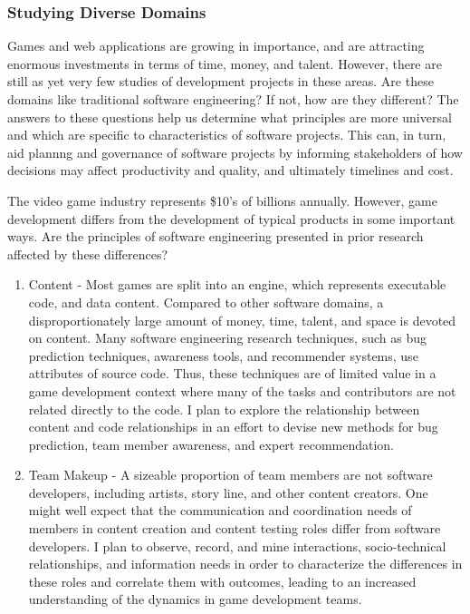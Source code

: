 \documentclass[10pt]{article}
\newcommand\Subsection[1]{\subsubsection*{\small #1}}
\begin{document}
\begin{small}
\Subsection{Studying Diverse Domains}

Games and web applications are growing in importance, and are attracting
enormous investments in terms of time, money, and talent. However, there are
still as yet very few studies of development projects in these areas. Are these
domains like traditional software engineering? If not, how are they different?
The answers to these questions help us determine what principles are more
universal and which are specific to characteristics of software projects.  This
can, in turn, aid plannng and governance of software projects by informing
stakeholders of how decisions may affect productivity and quality, and ultimately
timelines and cost.

The video game industry represents \$10's of billions annually. However, game
development differs from the development of typical products in some important
ways.  Are the principles of software engineering presented in prior research
affected by these differences?

\begin{enumerate}

\item Content - Most games are split into an engine, which represents executable code,
    and data content. Compared to other software domains, a disproportionately large
    amount of money, time, talent, and space is devoted on content.  
    Many software engineering research techniques, such as
    bug prediction techniques, awareness tools, and recommender systems, use attributes
    of source code. Thus, these techniques are of limited value
    in a game development context where many of the tasks and contributors are
    not related directly to the code. I plan to explore the relationship between content
    and code relationships in an effort to devise new
    methods for bug prediction, team member awareness, and expert recommendation.

\item Team Makeup - A sizeable proportion of team members
    are not software developers, including artists, story line, and other content creators.
    One might well expect that the communication and coordination needs of members
    in content creation and content testing roles differ from software developers.  I plan to observe, record, and mine
    interactions, socio-technical relationships, and information 
    needs in order to characterize the differences in these roles
    and correlate them with outcomes, leading 
    to an increased understanding of the dynamics in game development teams.


\end{enumerate}
\end{small}
\end{document}
